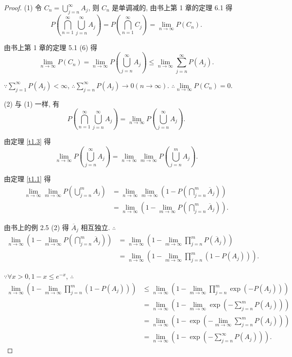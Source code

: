 \documentclass{ctexart}
\begin{document}
\begin{proof}
    (1) 令 $C_n=\bigcup\limits_{j=n}^\infty A_j$, 则 $C_n$ 是单调减的, 由书上第 1 章的定理 6.1 得
    \[P\left(\bigcap\limits_{n=1}^\infty\bigcup\limits_{j=n}^\infty A_j\right)=P\left(\bigcap\limits_{n=1}^\infty C_j\right)=\lim\limits_{n\to\infty}P(C_n).\]

    由书上第 1 章的定理 5.1 (6) 得
    \[\lim\limits_{n\to\infty}P(C_n)=\lim\limits_{n\to\infty}P\left(\bigcup\limits_{j=n}^\infty A_j\right)\leq\lim\limits_{n\to\infty}\sum\limits_{j=n}^\infty P(A_j).\]

    $\because\sum\limits_{j=1}^\infty P(A_j)<\infty$, $\therefore\sum\limits_{j=n}^\infty P(A_j)\to0(n\to\infty)$. $\therefore\lim\limits_{n\to\infty}P(C_n)=0$.

    (2) 与 (1) 一样, 有
    \[P\left(\bigcap\limits_{n=1}^\infty\bigcup\limits_{j=n}^\infty A_j\right)=\lim\limits_{n\to\infty}P\left(\bigcup\limits_{j=n}^\infty A_j\right).\]
    
    由定理 \ref{t1.3} 得
    \[\lim\limits_{n\to\infty}P\left(\bigcup\limits_{j=n}^\infty A_j\right)=\lim\limits_{n\to\infty}\lim\limits_{m\to\infty}P\left(\bigcup\limits_{j=n}^mA_j\right).\]

    由定理 \ref{t1.1} 得
    \begin{align*}
        \lim\limits_{n\to\infty}\lim\limits_{m\to\infty}P\left(\bigcup\limits_{j=n}^mA_j\right) & =\lim\limits_{n\to\infty}\lim\limits_{m\to\infty}\left(1-P\left(\bigcap\limits_{j=n}^m\overline{A}_j\right)\right) \\
        & =\lim\limits_{n\to\infty}\left(1-\lim\limits_{m\to\infty}P\left(\bigcap\limits_{j=n}^m\overline{A}_j\right)\right).
    \end{align*}

    由书上的例 2.5 (2) 得 $\overline{A}_j$ 相互独立. $\therefore$
    \begin{align*}
        \lim\limits_{n\to\infty}\left(1-\lim\limits_{m\to\infty}P\left(\bigcap\limits_{j=n}^m\overline{A}_j\right)\right) & =\lim\limits_{n\to\infty}\left(1-\lim\limits_{m\to\infty}\prod\limits_{j=n}^mP(\overline{A}_j)\right) \\
        & =\lim\limits_{n\to\infty}\left(1-\lim\limits_{m\to\infty}\prod\limits_{j=n}^m(1-P(A_j))\right).
    \end{align*}

    $\because\forall x>0,1-x\leq e^{-x}$, $\therefore$
    \begin{align*}
        \lim\limits_{n\to\infty}\left(1-\lim\limits_{m\to\infty}\prod\limits_{j=n}^m(1-P(A_j))\right) & \leq\lim\limits_{n\to\infty}\left(1-\lim\limits_{m\to\infty}\prod\limits_{j=n}^m\exp(-P(A_j))\right) \\
        & =\lim\limits_{n\to\infty}\left(1-\lim\limits_{m\to\infty}\exp\left(-\sum\limits_{j=n}^mP(A_j)\right)\right) \\
        & =\lim\limits_{n\to\infty}\left(1-\exp\left(-\lim\limits_{m\to\infty}\sum\limits_{j=n}^mP(A_j)\right)\right) \\
        & =\lim\limits_{n\to\infty}\left(1-\exp\left(-\sum\limits_{j=n}^\infty P(A_j)\right)\right).
    \end{align*}


\end{proof}
\end{document}
